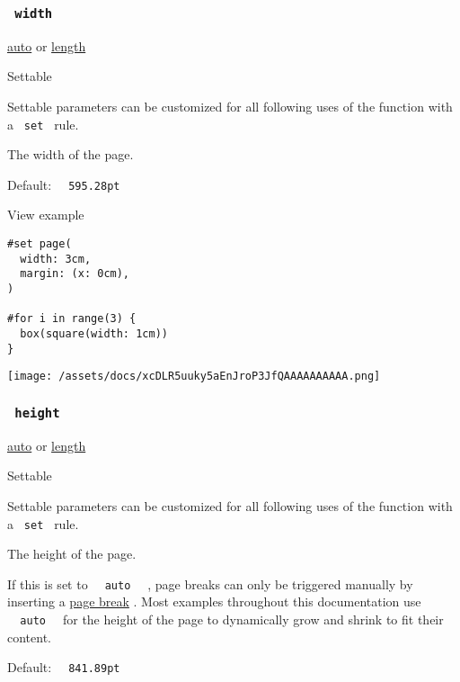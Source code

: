 \subsubsection{\texorpdfstring{\texttt{\ width\ }}{ width }}\label{parameters-width}

\href{/docs/reference/foundations/auto/}{auto} {or}
\href{/docs/reference/layout/length/}{length}

{{ Settable }}

\label{parameters-width-settable-tooltip}
Settable parameters can be customized for all following uses of the
function with a \texttt{\ set\ } rule.

The width of the page.

Default: \texttt{\ }{\texttt{\ 595.28pt\ }}\texttt{\ }


View example

\begin{verbatim}
#set page(
  width: 3cm,
  margin: (x: 0cm),
)

#for i in range(3) {
  box(square(width: 1cm))
}
\end{verbatim}

\texttt{[image: /assets/docs/xcDLR5uuky5aEnJroP3JfQAAAAAAAAAA.png]}

\subsubsection{\texorpdfstring{\texttt{\ height\ }}{ height }}\label{parameters-height}

\href{/docs/reference/foundations/auto/}{auto} {or}
\href{/docs/reference/layout/length/}{length}

{{ Settable }}

\label{parameters-height-settable-tooltip}
Settable parameters can be customized for all following uses of the
function with a \texttt{\ set\ } rule.

The height of the page.

If this is set to \texttt{\ }{\texttt{\ auto\ }}\texttt{\ } , page
breaks can only be triggered manually by inserting a
\href{/docs/reference/layout/pagebreak/}{page break} . Most examples
throughout this documentation use
\texttt{\ }{\texttt{\ auto\ }}\texttt{\ } for the height of the page to
dynamically grow and shrink to fit their content.

Default: \texttt{\ }{\texttt{\ 841.89pt\ }}\texttt{\ }

